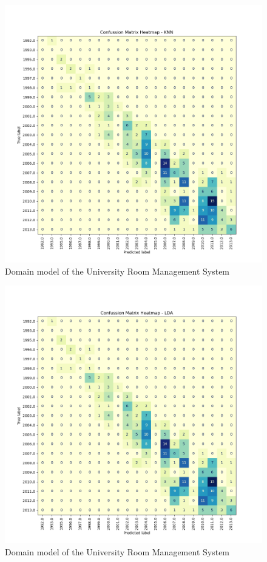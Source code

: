 \documentclass[conference,onecolumn]{IEEEtran}
\begin{document}
    \begin{figure}[H]
		\centering
		\includegraphics[width=1\textwidth]{Plots/CM_Heatmap_KNN.png}
		\caption{Domain model of the University Room Management System}
		\label{appx:cmheatmapknn}
	\end{figure}
    \begin{figure}[H]
		\centering
		\includegraphics[width=1\textwidth]{Plots/CM_Heatmap_LDA.png}
		\caption{Domain model of the University Room Management System}
		\label{appx:cmheatmaplda}
	\end{figure}
\end{document}
